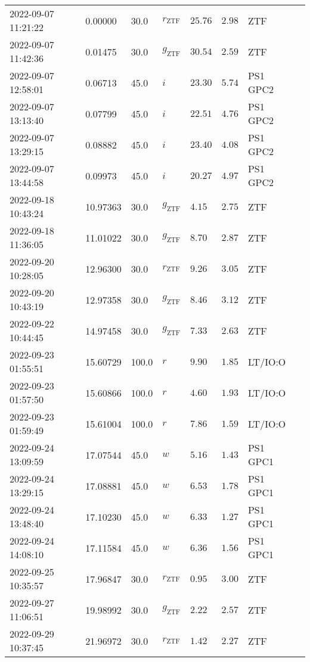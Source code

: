 \documentclass{nature_plusfigure}
\begin{document}
\begin{supplement}
\begin{center}
\begin{longtable}{llllllll}
2022-09-07 11:21:22 & 0.00000 & 30.0 & ${r}_\mathrm{ZTF}$ & $25.76$ & $2.98$ & ZTF &  \\ 
2022-09-07 11:42:36 & 0.01475 & 30.0 & ${g}_\mathrm{ZTF}$ & $30.54$ & $2.59$ & ZTF &  \\ 
2022-09-07 12:58:01 & 0.06713 & 45.0 & $i$ & $23.30$ & $5.74$ & PS1 GPC2 &  \\ 
2022-09-07 13:13:40 & 0.07799 & 45.0 & $i$ & $22.51$ & $4.76$ & PS1 GPC2 &  \\ 
2022-09-07 13:29:15 & 0.08882 & 45.0 & $i$ & $23.40$ & $4.08$ & PS1 GPC2 &  \\ 
2022-09-07 13:44:58 & 0.09973 & 45.0 & $i$ & $20.27$ & $4.97$ & PS1 GPC2 &  \\ 
2022-09-18 10:43:24 & 10.97363 & 30.0 & ${g}_\mathrm{ZTF}$ & $4.15$ & $2.75$ & ZTF &  \\ 
2022-09-18 11:36:05 & 11.01022 & 30.0 & ${g}_\mathrm{ZTF}$ & $8.70$ & $2.87$ & ZTF &  \\ 
2022-09-20 10:28:05 & 12.96300 & 30.0 & ${r}_\mathrm{ZTF}$ & $9.26$ & $3.05$ & ZTF &  \\ 
2022-09-20 10:43:19 & 12.97358 & 30.0 & ${g}_\mathrm{ZTF}$ & $8.46$ & $3.12$ & ZTF &  \\ 
2022-09-22 10:44:45 & 14.97458 & 30.0 & ${g}_\mathrm{ZTF}$ & $7.33$ & $2.63$ & ZTF &  \\ 
2022-09-23 01:55:51 & 15.60729 & 100.0 & $r$ & $9.90$ & $1.85$ & LT/IO:O &  \\ 
2022-09-23 01:57:50 & 15.60866 & 100.0 & $r$ & $4.60$ & $1.93$ & LT/IO:O &  \\ 
2022-09-23 01:59:49 & 15.61004 & 100.0 & $r$ & $7.86$ & $1.59$ & LT/IO:O &  \\ 
2022-09-24 13:09:59 & 17.07544 & 45.0 & $w$ & $5.16$ & $1.43$ & PS1 GPC1 &  \\ 
2022-09-24 13:29:15 & 17.08881 & 45.0 & $w$ & $6.53$ & $1.78$ & PS1 GPC1 &  \\ 
2022-09-24 13:48:40 & 17.10230 & 45.0 & $w$ & $6.33$ & $1.27$ & PS1 GPC1 &  \\ 
2022-09-24 14:08:10 & 17.11584 & 45.0 & $w$ & $6.36$ & $1.56$ & PS1 GPC1 &  \\ 
2022-09-25 10:35:57 & 17.96847 & 30.0 & ${r}_\mathrm{ZTF}$ & $0.95$ & $3.00$ & ZTF &  \\ 
2022-09-27 11:06:51 & 19.98992 & 30.0 & ${g}_\mathrm{ZTF}$ & $2.22$ & $2.57$ & ZTF &  \\ 
2022-09-29 10:37:45 & 21.96972 & 30.0 & ${r}_\mathrm{ZTF}$ & $1.42$ & $2.27$ & ZTF &  \\ 

\end{longtable}
\end{center}
\end{supplement}
\end{document}
